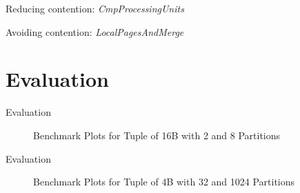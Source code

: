 \begin{frame}{Reducing contention: \emph{CmpProcessingUnits}}

\end{frame}
\begin{frame}{Avoiding contention: \emph{LocalPagesAndMerge}}

\end{frame}
\section{Evaluation}
\begin{frame}{Evaluation}
  \begin{figure}[h]
    \centering
    \begin{subfigure}{.49\textwidth}
      \centering
      \resizebox{\linewidth}{!}{}
    \end{subfigure}
    \begin{subfigure}{.49\textwidth}
      \centering
      \resizebox{\linewidth}{!}{}
    \end{subfigure}
    \begin{subfigure}{\textwidth}
      \centering
      \resizebox{.85\linewidth}{!}{}
    \end{subfigure}
    \caption[Shuffle Benchmark Plots for Tuple of 16B with 2 and 8 Partitions]{Benchmark Plots for Tuple of 16B with 2 and 8 Partitions}
    \label{plot-shuffle-16B-2-8}
  \end{figure}
\end{frame}

\begin{frame}{Evaluation}
  \begin{figure}[h]
    \centering
    \begin{subfigure}{.49\textwidth}
      \centering
      \resizebox{\linewidth}{!}{}
    \end{subfigure}
    \begin{subfigure}{.49\textwidth}
      \centering
      \resizebox{\linewidth}{!}{}
    \end{subfigure}
    \begin{subfigure}{\textwidth}
      \centering
      \resizebox{.85\linewidth}{!}{}
    \end{subfigure}
    \caption[Shuffle Benchmark Plots for Tuple of 4B with 32 and 1024 Partitions]{Benchmark Plots for Tuple of 4B with 32 and 1024 Partitions}
    \label{plot-shuffle-4B-32-1024}
  \end{figure}
\end{frame}

